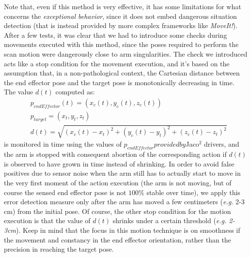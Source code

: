 Note that, even if this method is very effective, it has some limitations for what concerns the \textit{exceptional behavior}, since it does not embed dangerous situation detection (that is instead provided by more complex frameworks like \textit{MoveIt!}). After a few tests, it was clear that we had to introduce some checks during movements executed with this method, since the poses required to perform the scan motion were dangerously close to arm singularities. The check we introduced acts like a stop condition for the movement execution, and it's based on the assumption that, in a non-pathological context, the Cartesian distance between the end effector pose and the target pose is monotonically decreasing in time. The value $d(t)$ computed as:
\begin{align*}
	& p_{endEffector}(t) = (x_c(t),y_c(t),z_c(t)) \\
	& p_{target} = (x_t,y_t,z_t) \\
	& d(t)=\sqrt{(x_c(t)-x_t)^2+(y_c(t)-y_t)^2+(z_c(t)-z_t)^2}
\end{align*}
is monitored in time using the values of $p_{endEffector} provided by $Jaco$^2$ drivers, and the arm is stopped with consequent abortion of the corresponding action if $d(t)$ is observed to have grown in time instead of shrinking. In order to avoid false positives due to sensor noise when the arm still has to actually start to move in the very first moment of the action execution (the arm is not moving, but of course the sensed end effector pose is not $100\%$ stable over time), we apply this error detection measure only after the arm has moved a few centimeters (\textit{e.g.} 2-3 cm) from the initial pose. Of course, the other stop condition for the motion execution is that the value of $d(t)$ shrinks under a certain threshold (\textit{e.g. 2-3cm}). Keep in mind that the focus in this motion technique is on smoothness if the movement and constancy in the end effector orientation, rather than the precision in reaching the target pose. 

